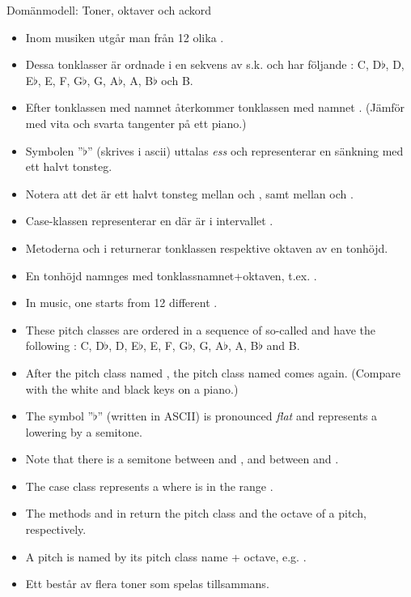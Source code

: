 \begin{Slide}{Domänmodell: Toner, oktaver och ackord}\SlideFontSmall
\begin{itemize}
\ifswedish
\item
Inom musiken utgår man från 12 olika  .

\item Dessa tonklasser är ordnade i en sekvens av s.k.  och har följande :
C, D$\flat$, D, E$\flat$, E, F, G$\flat$, G, A$\flat$, A, B$\flat$ och B.
\item Efter tonklassen med namnet  återkommer tonklassen med namnet . (Jämför med vita och svarta tangenter på ett piano.)
\item Symbolen ''$\flat$'' (skrives  i ascii) uttalas \emph{ess} och representerar en sänkning med ett halvt tonsteg.
\item Notera att det är ett halvt tonsteg mellan  och , samt mellan  och .
\item Case-klassen  representerar en  där  är i intervallet .
\item Metoderna  och  i  returnerar tonklassen respektive oktaven av en tonhöjd.
\item En tonhöjd namnges med tonklassnamnet+oktaven, t.ex. .
\else
\item
In music, one starts from 12 different .

\item These pitch classes are ordered in a sequence of so-called  and have the following :
C, D$\flat$, D, E$\flat$, E, F, G$\flat$, G, A$\flat$, A, B$\flat$ and B.
\item After the pitch class named , the pitch class named  comes again. (Compare with the white and black keys on a piano.)
\item The symbol ''$\flat$'' (written  in ASCII) is pronounced \emph{flat} and represents a lowering by a semitone.
\item Note that there is a semitone between  and , and between  and .
\item The case class  represents a  where  is in the range .
\item The methods  and  in  return the pitch class and the octave of a pitch, respectively.
\item A pitch is named by its pitch class name + octave, e.g. .
\fi

\item Ett  består av flera toner som spelas tillsammans.
\end{itemize}
\end{Slide}




